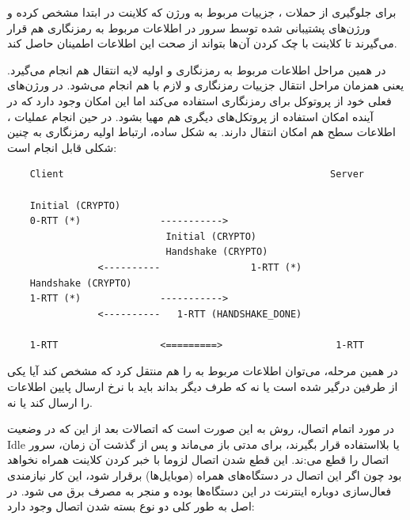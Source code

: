 \documentclass[12pt]{article}
\begin{document}
\begin{enumerate}
برای جلوگیری از حملات ، جزییات مربوط به ورژن که کلاینت در ابتدا مشخص کرده و ورژن‌های پشتیبانی شده توسط سرور در اطلاعات مربوط به  رمزنگاری هم قرار می‌گیرند تا کلاینت با چک کردن آن‌ها بتواند از صحت این اطلاعات اطمینان حاصل کند.

در همین مراحل اطلاعات مربوط به رمزنگاری و  اولیه لایه انتقال هم انجام می‌گیرد. یعنی همزمان مراحل انتقال جزییات رمزنگاری و  لازم با هم انجام می‌شود.  در ورژن‌های فعلی خود از پروتوکل  برای رمزنگاری استفاده می‌کند اما این امکان وجود دارد که در آینده امکان استفاده از پروتکل‌های دیگری هم مهیا بشود. در حین انجام عملیات ، اطلاعات سطح  هم امکان انتقال دارند. به شکل ساده، ارتباط اولیه رمزنگاری به چنین شکلی قابل انجام است:

\begin{center}

\begin{latin}
	\begin{Verbatim}
	Client                                               Server
	
	Initial (CRYPTO)
	0-RTT (*)              ----------->
							Initial (CRYPTO)
							Handshake (CRYPTO)
				<----------                1-RTT (*)
	Handshake (CRYPTO)
	1-RTT (*)              ----------->
				<----------   1-RTT (HANDSHAKE_DONE)
	
	1-RTT                  <=========>                    1-RTT
	\end{Verbatim}
\end{latin}
	
\end{center}

	در همین مرحله، می‌توان اطلاعات مربوط به  را هم منتقل کرد که مشخص کند آیا یکی از طرفین درگیر  شده است یا نه که طرف دیگر بداند باید با نرخ ارسال پایین اطلاعات را ارسال کند یا نه.
	
	
	در مورد اتمام اتصال، روش به این صورت است که اتصالات بعد از این که در وضعیت Idle‌ یا بلااستفاده قرار بگیرند، برای مدتی باز می‌ماند و پس از گذشت آن زمان، سرور اتصال را قطع می‌:ند. این قطع شدن اتصال لزوما با خبر کردن کلاینت همراه نخواهد بود چون اگر این اتصال در دستگاه‌های همراه (موبایل‌ها) برقرار شود، این کار نیازمندی فعال‌سازی دوباره اینترنت در این دستگاه‌ها بوده و منجر به مصرف برق می شود. در اصل به طور کلی دو نوع بسته شدن اتصال وجود دارد:
	

\end{enumerate}
\end{document}
